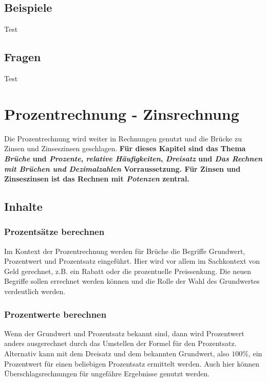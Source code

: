 \documentclass{article}
\begin{document}
\subsection{Beispiele}
\begin{tcolorbox}[colback=gray!5!white,colframe=gray!25!black]
Test
\end{tcolorbox}
\subsection{Fragen}
\begin{tcolorbox}[colback=blue!5!white,colframe=blue!25!black]
Test
\end{tcolorbox}
\newpage

\section{Prozentrechnung - Zinsrechnung}
Die Prozentrechnung wird weiter in Rechnungen genutzt und die Brücke zu Zinsen und Zinseszinsen geschlagen.
\textbf{Für dieses Kapitel sind das Thema \textit{Brüche} und \textit{Prozente}, \textit{relative Häufigkeiten}, \textit{Dreisatz} und \textit{Das Rechnen mit Brüchen und Dezimalzahlen} Vorraussetzung. Für Zinsen und Zinseszinsen ist das Rechnen mit \textit{Potenzen} zentral.}
\subsection{Inhalte}
\subsubsection*{Prozentsätze berechnen}
Im Kontext der Prozentrechnung werden für Brüche die Begriffe Grundwert, Prozentwert und Prozentsatz eingeführt.
Hier wird vor allem im Sachkontext von Geld gerechnet, z.B.  ein Rabatt oder die prozentuelle Preissenkung. 
Die neuen Begriffe sollen errechnet werden können und die Rolle der Wahl des Grundwertes verdeutlich werden.
\subsubsection*{Prozentwerte berechnen}
Wenn der Grundwert und Prozentsatz bekannt sind, dann wird Prozentwert anders ausgerechnet durch das Umstellen der Formel für den Prozentsatz.
Alternativ kann mit dem Dreisatz und dem bekannten Grundwert, also $100\%$, ein Prozentwert für einen beliebigen Prozentsatz ermittelt werden.
Auch hier können Überschlagsrechnungen für ungefähre Ergebnisse genutzt werden.
\end{document}
